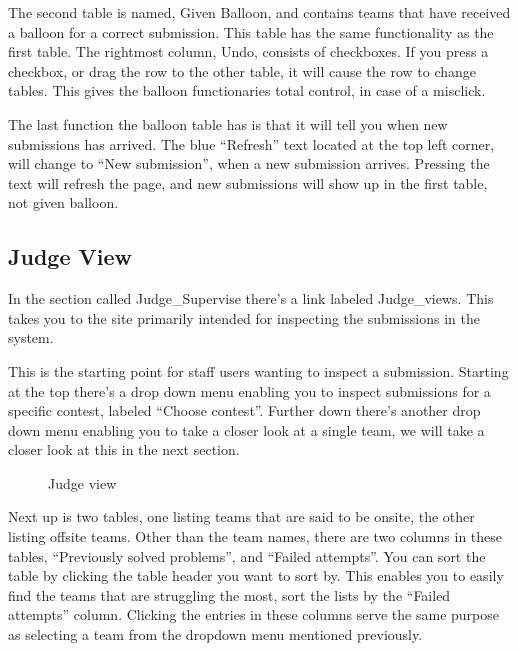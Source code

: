 The second table is named, Given Balloon, and contains teams that have
received a balloon for a correct submission. This table has the same
functionality as the first table. The rightmost column, Undo, consists
of checkboxes. If you press a checkbox, or drag the row to the other
table, it will cause the row to change tables. This gives the balloon
functionaries total control, in case of a misclick.


The last function the balloon table has is that it will tell you when
new submissions has arrived. The blue
{\textquotedblleft}Refresh{\textquotedblright} text located at the top
left corner, will change to {\textquotedblleft}New
submission{\textquotedblright}, when a new submission arrives. Pressing
the text will refresh the page, and new submissions will show up in the
first table, not given balloon. 


\subsection{Judge View}

In the section called Judge\_Supervise there{\textquoteright}s a link
labeled Judge\_views. This takes you to the site primarily intended for
inspecting the submissions in the system. 

This is the starting point for staff users wanting to inspect a
submission. Starting at the top there{\textquoteright}s a drop down
menu enabling you to inspect submissions for a specific contest,
labeled {\textquotedblleft}Choose contest{\textquotedblright}. Further
down there{\textquoteright}s another drop down menu enabling you to
take a closer look at a single team, we will take a closer look at this
in the next section. 

\begin{figure}
\centering
	\caption{Judge view}
	\label{fig:judgeView}
\end{figure}

\bigskip

Next up is two tables, one listing teams that are said to be onsite, the
other listing offsite teams. Other than the team names, there are two
columns in these tables, {\textquotedblleft}Previously solved
problems{\textquotedblright}, and {\textquotedblleft}Failed
attempts{\textquotedblright}. You can sort the table by clicking the
table header you want to sort by. This enables you to easily find the
teams that are struggling the most, sort the lists by the
{\textquotedblleft}Failed attempts{\textquotedblright} column. Clicking
the entries in these columns serve the same purpose as selecting a team
from the dropdown menu mentioned previously. 


